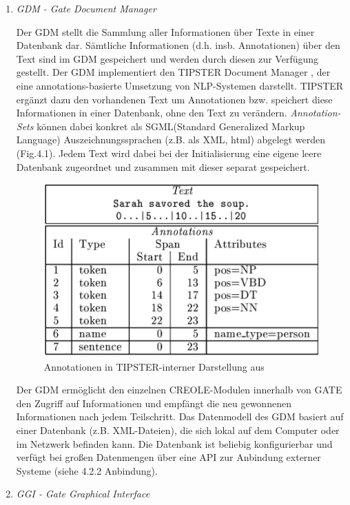 \documentclass[12pt]{report}
\begin{document}
\begin{enumerate}
\item \textit{GDM - Gate Document Manager}

Der GDM stellt die Sammlung aller Informationen über Texte in einer Datenbank dar. Sämtliche Informationen (d.h. insb. Annotationen) über den Text sind im GDM gespeichert und werden durch diesen zur Verfügung gestellt. Der GDM implementiert den TIPSTER Document Manager \cite{cu97}, der eine annotations-basierte Umsetzung von NLP-Systemen darstellt. TIPSTER ergänzt dazu den vorhandenen Text um Annotationen bzw. speichert diese Informationen in einer Datenbank, ohne den Text zu verändern. \textit{Annotation-Sets} können dabei konkret als SGML(Standard Generalized Markup Language) Auszeichnungssprachen (z.B. als XML, html) abgelegt werden (Fig.4.1). Jedem Text wird dabei bei der Initialisierung eine eigene leere Datenbank zugeordnet und zusammen mit dieser separat gespeichert.

\begin{figure}[h!]
\begin{center}
\includegraphics[scale=0.5]{GATE_Bilder/Tipster.jpg}
\caption{Annotationen in TIPSTER-interner Darstellung aus \cite{cu97}}
\end{center}
\end{figure} 

Der GDM ermöglicht den einzelnen CREOLE-Modulen innerhalb von GATE den Zugriff auf Informationen und empfängt die neu gewonnenen Informationen nach jedem Teilschritt. Das Datenmodell des GDM basiert auf einer Datenbank (z.B. XML-Dateien), die sich lokal auf dem Computer oder im Netzwerk befinden kann. Die Datenbank ist beliebig konfigurierbar und verfügt bei großen Datenmengen über eine API zur Anbindung externer Systeme (siehe 4.2.2 \glqq  Anbindung\grqq{}). 
\item \textit{GGI - Gate Graphical Interface}


\end{enumerate}
\end{document}
